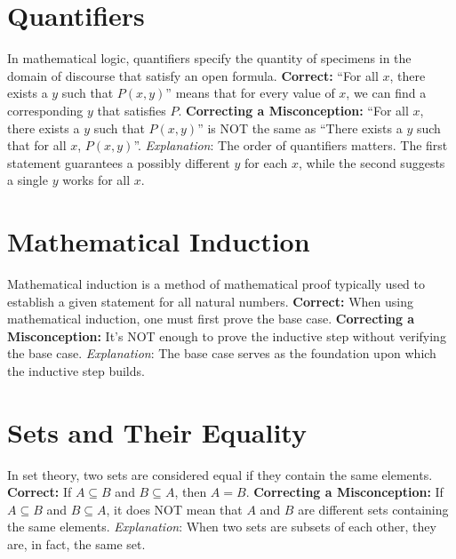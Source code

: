 \documentclass[12pt]{article}
\newenvironment{correct}{\noindent\textbf{Correct:}}{}
\newenvironment{misconception}{\noindent\textbf{Correcting a Misconception:}}{}
\newenvironment{explanation}{\noindent\textit{Explanation}:}{\vspace{1em}}
\begin{document}
\section*{Quantifiers}
In mathematical logic, quantifiers specify the quantity of specimens in the domain of discourse that satisfy an open formula.
\begin{correct} ``For all \(x\), there exists a \(y\) such that \(P(x,y)\)'' means that for every value of \(x\), we can find a corresponding \(y\) that satisfies \(P\). \end{correct}
\begin{misconception} ``For all \(x\), there exists a \(y\) such that \(P(x,y)\)'' is NOT the same as ``There exists a \(y\) such that for all \(x\), \(P(x,y)\)''. \end{misconception}
\begin{explanation} The order of quantifiers matters. The first statement guarantees a possibly different \(y\) for each \(x\), while the second suggests a single \(y\) works for all \(x\). \end{explanation}

\section*{Mathematical Induction}
Mathematical induction is a method of mathematical proof typically used to establish a given statement for all natural numbers.
\begin{correct} When using mathematical induction, one must first prove the base case. \end{correct}
\begin{misconception} It's NOT enough to prove the inductive step without verifying the base case. \end{misconception}
\begin{explanation} The base case serves as the foundation upon which the inductive step builds. \end{explanation}

\section*{Sets and Their Equality}
In set theory, two sets are considered equal if they contain the same elements.
\begin{correct} If \(A \subseteq B\) and \(B \subseteq A\), then \(A = B\). \end{correct}
\begin{misconception} If \(A \subseteq B\) and \(B \subseteq A\), it does NOT mean that \(A\) and \(B\) are different sets containing the same elements. \end{misconception}
\begin{explanation} When two sets are subsets of each other, they are, in fact, the same set. \end{explanation}
\end{document}
